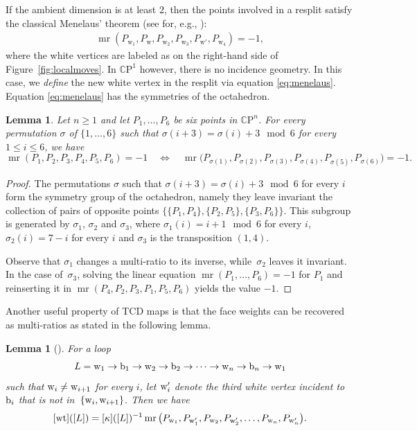 \documentclass[pdftex]{sigma}
\numberwithin{equation}{section}
\newtheorem{Lemma}[Theorem]{Lemma}
\newcommand{\CP}{{\mathbb C\mathrm P}}
\newcommand{\ra}{\rightarrow}
\newcommand{\la}{\label}
\def\mr{\operatorname{mr}}
\begin{document}
	If the ambient dimension is at least $2$, then the points involved in a resplit satisfy the classical Menelaus' theorem (see for, e.g., \cite{Lester}):
	\begin{align}
		\label{eq:menelaus}
		\mr(P_{\mathrm w_1},P_{\mathrm w},P_{\mathrm w_2},P_{\mathrm w_3},P_{\mathrm w'},P_{\mathrm w_4}) = -1,
	\end{align}
	where the white vertices are labeled as on the right-hand side of Figure~\ref{fig:localmoves}. In $\CP^1$ however, there is no incidence geometry. In this case, we \emph{define} the new white vertex in the resplit via equation \eqref{eq:menelaus}. Equation \eqref{eq:menelaus} has the symmetries of the octahedron.
	
	\begin{Lemma}
		Let $n\geq1$ and let $P_1,\dots, P_6$ be six points in $\CP^n$. For every permutation $\sigma$ of $\{1,\dots,6\}$ such that $\sigma(i+3)=\sigma(i)+3 \mod 6$ for every $1\leq i \leq 6$, we have
		\[
		\mr(P_1,P_2,P_3,P_4,P_5,P_6)=-1 \quad\Leftrightarrow\quad \mr\big(P_{\sigma(1)},P_{\sigma(2)},P_{\sigma(3)},P_{\sigma(4)},P_{\sigma(5)},P_{\sigma(6)}\big)=-1.
		\]
	\end{Lemma}
	
	\begin{proof}
		The permutations $\sigma$ such that $\sigma(i+3)=\sigma(i)+3 \mod 6$ for every $i$ form the symmetry group of the octahedron, namely they leave invariant the collection of pairs of opposite points $\{\{P_1,P_4\},\{P_2,P_5\},\{P_3,P_6\}\}$. This subgroup is generated by $\sigma_1$, $\sigma_2$ and $\sigma_3$, where $\sigma_1(i)=i+1\mod 6$ for every $i$, $\sigma_2(i)=7-i$ for every $i$ and $\sigma_3$ is the transposition $(1,4)$.
		
		
		Observe that $\sigma_1$ changes a multi-ratio to its inverse, while~$\sigma_2$ leaves it invariant. In the case of~$\sigma_3$, solving the linear equation $\mr(P_1,\dots,P_6)=-1$ for $P_1$ and reinserting it in $\mr(P_4,P_2,P_3,\allowbreak P_1,P_5,P_6)$ yields the value $-1$.
	\end{proof}

	
	Another useful property of TCD maps is that the face weights can be recovered as multi-ratios as stated in the following lemma.
	
	\begin{Lemma}[]\la{lem:mrcyl}
		For a loop
\[
L = {\rm w}_1 \ra {\rm b}_1 \ra {\rm w}_2 \ra {\rm b}_2 \ra \cdots \ra {\rm w}_n \ra {\rm b}_n \ra {\rm w}_1
\] such that ${\rm w}_i \neq {\rm w}_{i+1}$ for every $i$, let ${\rm w}_i'$ denote the third white vertex incident to ${\rm b}_i$ that is not in~${\{{\rm w}_i,{\rm w}_{i+1}\}}$. Then we have
		\[
		[{\rm wt}]([L]) =[\kappa]([L])^{-1} \mr \big(P_{{\rm w}_1}, P_{{\rm w}_1'},P_{{\rm w}_2},P_{{\rm w}_2'},\dots, P_{{\rm w}_n},P_{{\rm w}_n'}\big) .
		\]
	\end{Lemma}
	
\end{document}
